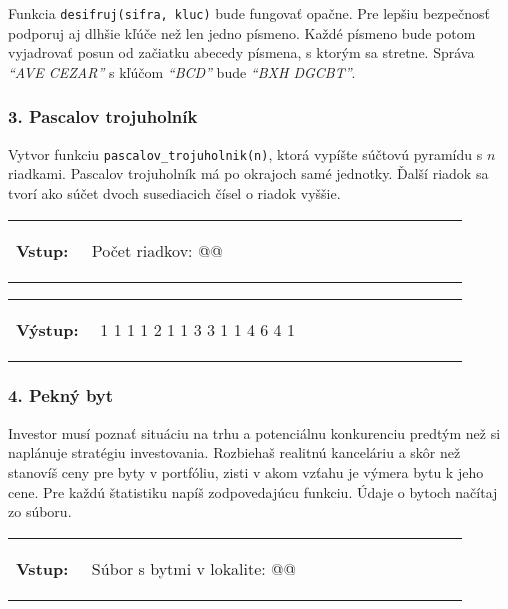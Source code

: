 Funkcia \verb|desifruj(sifra, kluc)| bude fungovať opačne. Pre lepšiu bezpečnosť podporuj aj dlhšie kľúče než len jedno písmeno. Každé písmeno bude potom vyjadrovať posun od začiatku abecedy písmena, s ktorým sa stretne. Správa \emph{``AVE CEZAR''} s kľúčom \emph{``BCD''} bude \emph{``BXH DGCBT''}.


\subsubsection*{3. Pascalov trojuholník}
Vytvor funkciu \verb|pascalov_trojuholnik(n)|, ktorá vypíšte súčtovú pyramídu s $n$ riadkami. Pascalov trojuholník má po okrajoch samé jednotky. Ďalší riadok sa tvorí ako súčet dvoch susediacich čísel o riadok vyššie.

\begin{tabular}{@{}p{0.15\linewidth}p{0.75\linewidth}}
\textbf{\small Vstup:} &
\vspace{-3em}
\begin{code}
Počet riadkov: @\fbox{5}@
\end{code}
\end{tabular}

\vspace{-2em}
\begin{tabular}{@{}p{0.15\linewidth}p{0.75\linewidth}}
\textbf{\small Výstup:} &
\vspace{-3em}
\begin{code}
    1
   1 1
  1 2 1
 1 3 3 1
1 4 6 4 1
\end{code}
\end{tabular}
\vspace{-2em}

\subsubsection*{4. Pekný byt}
Investor musí poznať situáciu na trhu a potenciálnu konkurenciu predtým než si naplánuje stratégiu investovania. Rozbiehaš realitnú kanceláriu a skôr než stanovíš ceny pre byty v portfóliu, zisti v akom vzťahu je výmera bytu k jeho cene. Pre každú štatistiku napíš zodpovedajúcu funkciu. Údaje o bytoch načítaj zo súboru.

\begin{tabular}{@{}p{0.15\linewidth}p{0.75\linewidth}}
\textbf{\small Vstup:} &
\vspace{-3em}
\begin{code}
Súbor s bytmi v lokalite: @\fbox{\phantom{vstup}}@
\end{code}
\end{tabular}

